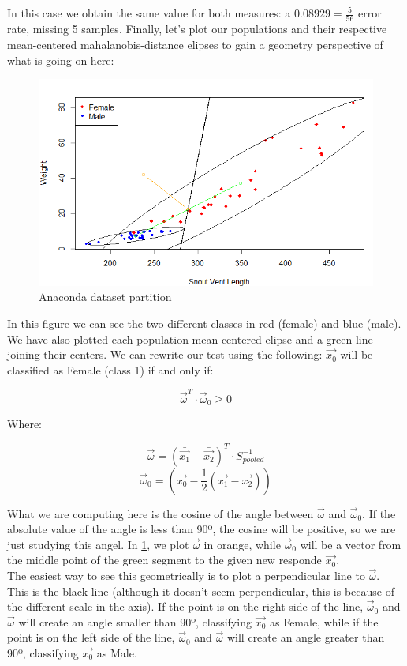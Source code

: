 \documentclass[11pt,a4paper]{article}
\begin{document}
	In this case we obtain the same value for both measures: a $0.08929 = \frac{5}{56}$ error rate, missing 5 samples. Finally, let's plot our populations and their respective mean-centered mahalanobis-distance elipses to gain a geometry perspective of what is going on here:
	
	\begin{figure}[H] 
		\centering
		\includegraphics[scale=.9]{./pics/LDA}
		\caption{Anaconda dataset partition} \label{anaconda-label}
	\end{figure}
	
	In this figure we can see the two different classes in red (female) and blue (male). We have also plotted each population mean-centered elipse and a green line joining their centers. We can rewrite our test using the following: $\vec{x_0}$ will be classified as Female (class 1) if and only if:
	
	$$ \vec{\omega}^T \cdot \vec{\omega}_0 \ge 0 $$
	
	Where:
	
	$$ \vec{\omega} = (\bar{\vec{x_1}} - \bar{\vec{x_2}})^T \cdot S_{pooled}^{-1} $$
	$$ \vec{\omega}_0 = (\vec{x_0} - \frac{1}{2}(\bar{\vec{x_1}} - \bar{\vec{x_2}})) $$
	
	What we are computing here is the cosine of the angle between $\vec{\omega}$ and $\vec{\omega}_0$. If the absolute value of the angle is less than 90º, the cosine will be positive, so we are just studying this angel. In \ref{anaconda-label}, we plot $\vec{\omega}$ in orange, while $\vec{\omega}_0$ will be a vector from the middle point of the green segment to the given new responde $\vec{x_0}$. \\
	
	The easiest way to see this geometrically is to plot a perpendicular line to $\vec{\omega}$. This is the black line (although it doesn't seem perpendicular, this is because of the different scale in the axis). If the point is on the right side of the line, $\vec{\omega}_0$ and $\vec{\omega}$ will create an angle smaller than 90º, classifying $\vec{x_0}$ as Female, while if the point is on the left side of the line, $\vec{\omega}_0$ and $\vec{\omega}$ will create an angle greater than 90º, classifying $\vec{x_0}$ as Male.
	
\end{document}
